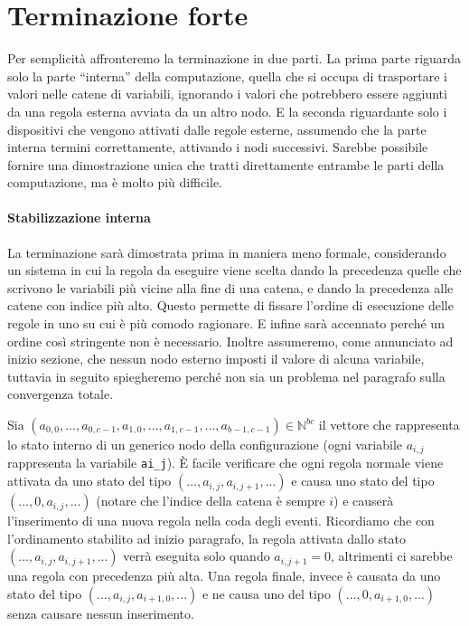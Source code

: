 \documentclass[target=bach]{thud}
\begin{document}
\section{Terminazione forte}

Per semplicità affronteremo la terminazione in due parti. La prima parte riguarda solo la parte ``interna'' della computazione, quella che si occupa di trasportare i valori nelle catene di variabili, ignorando i valori che potrebbero essere aggiunti da una regola esterna avviata da un altro nodo.
E la seconda riguardante solo i dispositivi che vengono attivati dalle regole esterne, assumendo che la parte interna termini correttamente, attivando i nodi successivi.
Sarebbe possibile fornire una dimostrazione unica che tratti direttamente entrambe le parti della computazione, ma è molto più difficile.

\paragraph{Stabilizzazione interna}

La terminazione sarà dimostrata prima in maniera meno formale, considerando un sistema in cui la regola da eseguire viene scelta dando la precedenza quelle che scrivono le variabili più vicine alla fine di una catena, e dando la precedenza alle catene con indice più alto. Questo permette di fissare l'ordine di esecuzione delle regole in uno su cui è più comodo ragionare. E infine sarà accennato perché un ordine così stringente non è necessario.
Inoltre assumeremo, come annunciato ad inizio sezione, che nessun nodo esterno imposti il valore di alcuna variabile, tuttavia in seguito spiegheremo perché non sia un problema nel paragrafo sulla convergenza totale.

Sia $(a_{0,0},...,a_{0,c-1},a_{1,0},...,a_{1,c-1},...,a_{b-1,c-1})\in \mathbb{N}^{bc}$ il vettore che rappresenta lo stato interno di un generico nodo della configurazione (ogni variabile $a_{i,j}$ rappresenta la variabile \lstinline{ai_j}). È facile verificare che ogni regola normale viene attivata da uno stato del tipo $(...,a_{i,j},a_{i,j+1},...)$ e causa uno stato del tipo $(...,0,a_{i,j},...)$ (notare che l'indice della catena è sempre $i$) e causerà l'inserimento di una nuova regola nella coda degli eventi.
Ricordiamo che con l'ordinamento stabilito ad inizio paragrafo, la regola attivata dallo stato $(...,a_{i,j},a_{i,j+1},...)$ verrà eseguita solo quando $a_{i,j+1}=0$, altrimenti ci sarebbe una regola con precedenza più alta.
Una regola finale, invece è causata da uno stato del tipo $(...,a_{i,j},a_{i+1,0},...)$ e ne causa uno del tipo $(...,0,a_{i+1,0},...)$ senza causare nessun inserimento.
\end{document}
